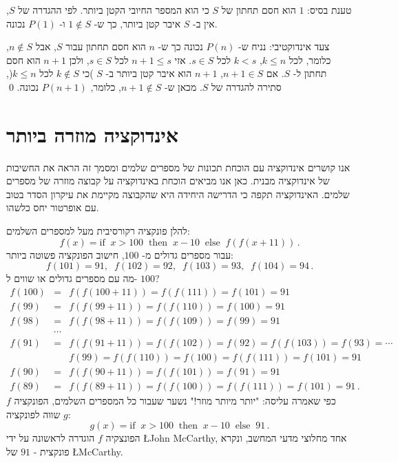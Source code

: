 טענת בסיס: 
$1$
הוא חסם תחתון של
$S$
כי הוא המספר החיובי הקטן ביותר. לפי ההגדרה של
$S$,
אין ב-%
$S$
איבר קטן ביותר, כך ש-%
$1\not\in S$
ו-%
$P(1)$
נכונה.

צעד אינדוקטיבי: נניח ש-%
$P(n)$
נכונה כך ש-%
$n$
הוא חסם תחתון עבור 
$S$, 
אבל
$n\not\in S$,
כלומר, לכל
$k\leq n$, $k<s$
לכל
$s\in S$.
אזי
$n+1\leq s$
לכל
$s \in S$,
ולכן
$n+1$
הוא חסם תחתון ל-%
$S$.
אם
$n+1\in S$,
$n+1$
הוא איבר קטן ביותר ב-%
$S$ 
)כי
$k\not\in S$
לכל
$k\leq n$(,
סתירה להגדרה של 
$S$.
מכאן ש-%
$n+1\not\in S$,
כלומר,
$P(n+1)$
נכונה.
\qed



\section{%
אינדוקציה מוזרה ביותר%
}

אנו קושרים אינדוקציה עם הוכחת תכונות של מספרים שלמים ומסמך זה הראה את החשיבות של אינדוקציה מבנית. כאן אנו מביאים הוכחת באינדוקציה על קבוצה מוזרה של מספרים שלמים. האינדוקציה תקפה כי הדרישה היחידה היא שהקבוצה מקיימת את עיקרון הסדר בטוב עם אופרטור יחס כלשהו.

להלן פונקציה רקורסיבית מעל למספרים השלמים:
\[
f(x) = \textrm{if}\;\; x > 100 \;\;\textrm{then}\;\; x - 10 \;\;\textrm{else}\;\; f(f(x+11))\,.
\]
עבור מספרים גדולים מ-
$100$,
חישוב הפונקציה פשוטה ביותר:
\[
f(101) = 91, \;\; f(102) = 92,\;\; f(103) = 93,\;\; f(104) = 94\,.
\]
מה עם מספרים גדולים או שווים ל-%
$100$?
\begin{eqnarray*}
f(100) &=& f(f(100+11)) = f(f(111)) = f(101) = 91\\
f(99) &=& f(f(99+11)) = f(f(110)) = f(100) = 91\\
f(98) &=& f(f(98+11)) = f(f(109)) = f(99) = 91\\
&\cdots&\\
f(91) &=& f(f(91+11)) = f(f(102)) = f(92) = f(f(103)) = f(93) = \cdots\\
&&f(99) = f(f(110)) = f(100) = f(f(111)) = f(101) = 91\\
f(90) &=& f(f(90+11)) = f(f(101)) = f(91) = 91\\
f(89) &=& f(f(89+11)) = f(f(100)) = f(f(111)) = f(101) = 91\,.
\end{eqnarray*}
כפי שאמרה עליסה: "יותר מיותר מוזר!" נשער שעבור כל המספרים השלמים, הפונקציה
$f$
שווה לפונקציה
$g$:
\[
g(x) = \textrm{if}\;\; x > 100 \;\;\textrm{then}\;\; x - 10 \;\;\textrm{else}\;\; 91\,.
\]
הפונצקיה
$f$
הוגדרה לראשונה על ידי
\L{John McCarthy},
אחד מחלוצי מדעי המחשב, ונקרא פונקצית -%
$91$
של
\L{McCarthy}.

